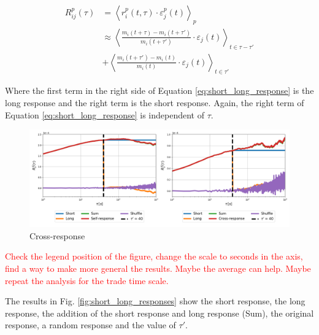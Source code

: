 \begin{align}\label{eq:short_long_response}
    R^{p}_{ij}\left(\tau\right)&=\left\langle r^{p}_{i}\left(t, \tau\right)
    \cdot\varepsilon^{p}_{j}\left(t\right)\right\rangle _{p} \nonumber \\
    &\approx\left\langle \frac{m_{i}\left(t+\tau\right)-m_{i}
    \left(t+\tau'\right)} {m_{i}\left(t+\tau'\right)}\cdot\varepsilon_{j}
    \left(t\right)\right\rangle _{t\in\tau-\tau'} \nonumber \\
    & +\left\langle \frac{m_{i}
    \left(t+\tau'\right)-m_{i}\left(t\right)}{m_{i}\left(t\right)}
    \cdot\varepsilon_{j}\left(t\right)\right\rangle _{t\in\tau'}
\end{align}

Where the first term in the right side of Equation \ref{eq:short_long_response}
is the long response and the right term is the short response. Again, the right
term of Equation \ref{eq:short_long_response} is independent of $\tau$.

\begin{figure}[htbp]
    \centering
    \includegraphics[width=\textwidth]
    {figures/05_short_long_GOOG_MA.png}
    \caption{Cross-response}
    \label{fig:short_long_cross-response}
\end{figure}

\textcolor{red}{Check the legend position of the figure, change the scale to
                seconds in the axis, find a way to make more general the
                results. Maybe the average can help. Maybe repeat the analysis
                for the trade time scale.}

The results in Fig. \ref{fig:short_long_responses} show the short response, the
long response, the addition of the short response and long response (Sum), the
original response, a random response and the value of $\tau'$.

